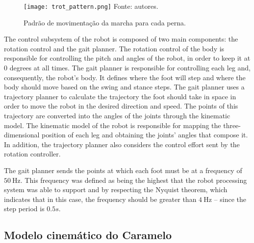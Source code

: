\documentclass[conference]{IEEEtran}
\begin{document}
\begin{figure}[!htb]
  \centering
  \caption{Padrão de movimentação da marcha para cada perna.}
  \texttt{[image: trot\_pattern.png]}
  \vfill
  Fonte: autores.
  \label{fig:trot_pattern}
\end{figure}

The control subsystem of the robot is composed of two main components: the rotation control and the gait planner. The rotation control of the body is responsible for controlling the pitch and angles of the robot, in order to keep it at 0 degrees at all times. The gait planner is responsible for controlling each leg and, consequently, the robot's body. It defines where the foot will step and where the body should move based on the swing and stance steps. The gait planner uses a trajectory planner to calculate the trajectory the foot should take in space in order to move the robot in the desired direction and speed. The points of this trajectory are converted into the angles of the joints through the kinematic model. The kinematic model of the robot is responsible for mapping the three-dimensional position of each leg and obtaining the joints' angles that compose it.  In addition, the trajectory planner also considers the control effort sent by the rotation controller.

The gait planner sends the points at which each foot must be at a frequency of $\SI{50}{\hertz}$. This frequency was defined as being the highest that the robot processing system was able to support and by respecting the Nyquist theorem, which indicates that in this case, the frequency should be greater than $\SI{4}{\hertz}$ -- since the step period is $0.5 s$.

\subsection{Modelo cinemático do Caramelo}
\label{sec:detail_inv_kinematics}
\end{document}
